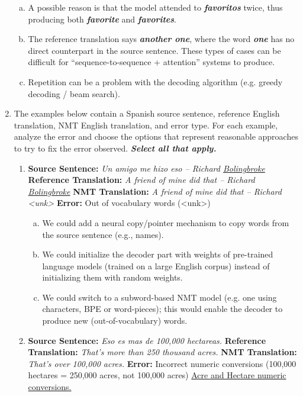 \begin{enumerate}[1.]
\begin{enumerate}[(a)]
\item A possible reason is that the model attended to {\bf {\em favoritos}} twice, thus producing both {\bf {\em favorite}} and {\bf {\em favorites}}.
\item The reference translation says {\bf {\em another one}}, where the word {\bf {\em one}} has no direct counterpart in the source sentence. These types of cases can be difficult for ``sequence-to-sequence + attention'' systems to produce.
\item Repetition can be a problem with the decoding algorithm (e.g. greedy decoding / beam search).
\end{enumerate}


\item
The examples below contain a Spanish source sentence, reference English translation, NMT English translation, and error type. For each example, analyze the error and choose the options that represent reasonable approaches to try to fix the error observed. {\bf {\em Select all that apply.}}

\begin{enumerate}[3a.]
\item {}
{\bf Source Sentence:} {\em Un amigo me hizo eso -- Richard \underline{Bolingbroke}}
{\bf Reference Translation:} {\em A friend of mine did that -- Richard \underline{Bolingbroke}}
{\bf NMT Translation:} {\em A friend of mine did that -- Richard <unk>}
{\bf Error:} Out of vocabulary words (<unk>)

\begin{enumerate}[(a)]
\item We could add a neural copy/pointer mechanism to copy words from the source sentence (e.g., names).
\item We could initialize the decoder part with weights of pre-trained language models (trained on a large English corpus) instead of initializing them with random weights.
\item We could switch to a subword-based NMT model (e.g. one using characters, BPE or word-pieces); this would enable the decoder to produce new (out-of-vocabulary) words.
\end{enumerate}


\item {}
{\bf Source Sentence:} {\em Eso es mas de 100,000 hectareas.}
{\bf Reference Translation:} {\em That's more than 250 thousand acres.}
{\bf NMT Translation:} {\em That's over 100,000 acres.}
{\bf Error:} Incorrect numeric conversions (100,000 hectares = 250,000 acres, not 100,000 acres)
\href{https://www.unitconverters.net/area/acres-to-hectare.htm}{Acre and Hectare numeric conversions.}


\end{enumerate}
\end{enumerate}
